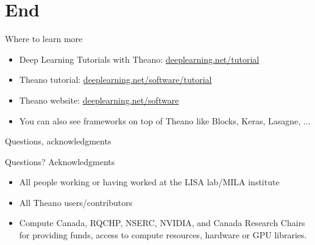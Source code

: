 \documentclass[utf8x,xcolor=pdftex,dvipsnames,table]{beamer}
\begin{document}
\section{End}
\begin{frame}{Where to learn more}
\normalsize
\begin{itemize}
\item Deep Learning Tutorials with Theano: \url{deeplearning.net/tutorial}
\item Theano tutorial: \url{deeplearning.net/software/tutorial}
\item Theano website: \url{deeplearning.net/software}
\item You can also see frameworks on top of Theano like Blocks, Keras, Lasagne, ...
\end{itemize}

\end{frame}

\begin{frame}{Questions, acknowledgments}
\Huge
\begin{center}
Questions?\newline
Acknowledgments
\end{center}
\normalsize
\begin{itemize}
\item All people working or having worked at the LISA lab/MILA institute
\item All Theano users/contributors
\item Compute Canada, RQCHP, NSERC, NVIDIA, and Canada Research Chairs for providing funds, access to compute resources, hardware or GPU libraries.
\end{itemize}

\end{frame}
\end{document}
